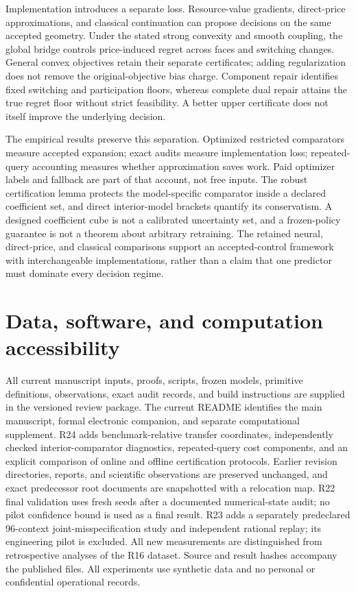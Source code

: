 \documentclass[11pt,letterpaper]{article}
\theoremstyle{definition}
\newcommand{\1}{\mathbf 1}
\begin{document}
Implementation introduces a separate loss. Resource-value gradients,
direct-price approximations, and classical continuation can propose decisions
on the same accepted geometry. Under the stated strong convexity and smooth
coupling, the global bridge controls price-induced regret across faces and
switching changes. General convex objectives retain their separate certificates;
adding regularization does not remove the original-objective bias charge.
Component repair identifies fixed switching and participation floors, whereas
complete dual repair attains the true regret floor without strict feasibility.
A better upper certificate does not itself improve the underlying decision.

The empirical results preserve this separation. Optimized restricted
comparators measure accepted expansion; exact audits measure implementation
loss; repeated-query accounting measures whether approximation saves work.
Paid optimizer labels and fallback are part of that account, not free inputs.
The robust certification lemma protects the model-specific comparator inside a
declared coefficient set, and direct interior-model brackets quantify its
conservatism. A designed coefficient cube is not a calibrated uncertainty set,
and a frozen-policy guarantee is not a theorem about arbitrary retraining.
The retained neural, direct-price, and classical comparisons support an
accepted-control framework with interchangeable implementations, rather than a
claim that one predictor must dominate every decision regime.

\section*{Data, software, and computation accessibility}
All current manuscript inputs, proofs, scripts, frozen models, primitive definitions, observations, exact audit records, and build instructions are supplied in the versioned review package. The current README identifies the main manuscript, formal electronic companion, and separate computational supplement. R24 adds benchmark-relative transfer coordinates, independently checked interior-comparator diagnostics, repeated-query cost components, and an explicit comparison of online and offline certification protocols. Earlier revision directories, reports, and scientific observations are preserved unchanged, and exact predecessor root documents are snapshotted with a relocation map. R22 final validation uses fresh seeds after a documented numerical-state audit; no pilot confidence bound is used as a final result. R23 adds a separately predeclared 96-context joint-misspecification study and independent rational replay; its engineering pilot is excluded. All new measurements are distinguished from retrospective analyses of the R16 dataset. Source and result hashes accompany the published files. All experiments use synthetic data and no personal or confidential operational records.
\clearpage\label{r19-reference-start}
\end{document}
